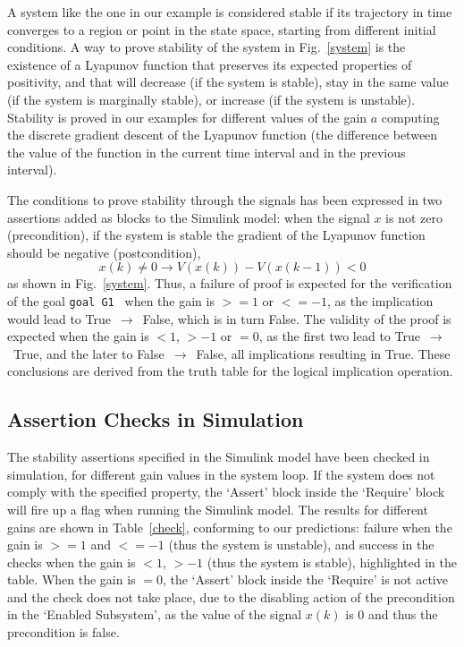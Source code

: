 \documentclass[a4paper]{article}
\begin{document}
A system like the one in our example is considered stable if its trajectory in time converges to a region or point in the state space, starting from different initial conditions. A way to prove stability of the system in Fig.~\ref{system} is the existence of a Lyapunov function that preserves its expected properties of positivity, and that will decrease (if the system is stable), stay in the same value (if the system is marginally stable), or increase (if the system is unstable). Stability is proved in our examples for different values of the gain $a$ computing the discrete gradient descent of the Lyapunov function (the difference between the value of the function in the current time interval and in the previous interval). 

The conditions to prove stability through the signals has been expressed in two assertions added as blocks to the Simulink model: when the signal $x$ is not zero (precondition), if the system is stable the gradient of the Lyapunov function should be negative (postcondition), 
\begin{equation}
x(k)\neq0 \rightarrow V(x(k))-V(x(k-1))<0
\end{equation}
as shown in Fig.~\ref{system}. Thus, a failure of proof is expected for the verification of the goal \verb+goal G1 + when the gain is $>=1$ or $<=-1$, as the implication would lead to True~$\rightarrow$~False, which is in turn False. The validity of the proof is expected when the gain is $<1$, $>-1$ or $=0$, as the first two lead to True~$\rightarrow$~True, and the later to False~$\rightarrow$~False, all implications resulting in True. These conclusions are derived from the truth table for the logical implication operation. 

\subsection{Assertion Checks in Simulation}

The stability assertions specified in the Simulink model have been checked in simulation, for different gain values in the system loop. If the system does not comply with the specified property, the `Assert' block inside the `Require' block will fire up a flag when running the Simulink model. The results for different gains are shown in Table~\ref{check}, conforming to our predictions: failure when the gain is $>=1$ and $<=-1$ (thus the system is unstable), and success in the checks when the gain is $<1$, $>-1$ (thus the system is stable), highlighted in the table. When the gain is $=0$, the `Assert' block inside the `Require' is not active and the check does not take place, due to the disabling action of the precondition in the `Enabled Subsystem', as the value of the signal $x(k)$ is 0 and thus the precondition is false. 
\end{document}

